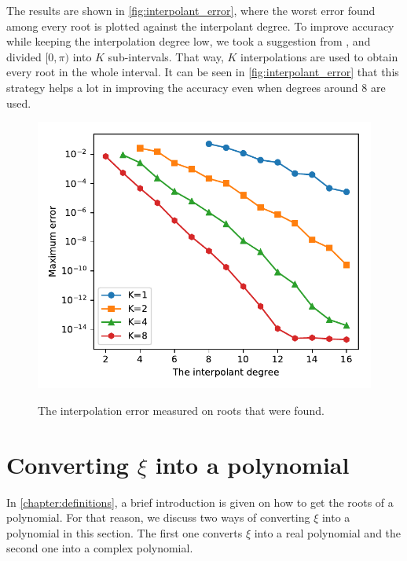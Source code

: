 The results are shown in \autoref{fig:interpolant_error}, where the worst error found among every root is plotted against the interpolant degree. To improve accuracy while keeping the interpolation degree low, we took a suggestion from , and divided  $[0, \pi)$ into $K$ sub-intervals. That way, $K$ interpolations are used to obtain every root in the whole interval. It can be seen in \autoref{fig:interpolant_error} that this strategy helps a lot in improving the accuracy even when degrees around $8$ are used.

\begin{figure}
	\centering
	\caption{The interpolation error measured on roots that were found.}
	\includegraphics{tex/figures/interpolant_error}
	\fautor
	\label{fig:interpolant_error}
\end{figure}

\section{Converting $\xi$ into a polynomial}

In \autoref{chapter:definitions}, a brief introduction is given on how to get the roots of a polynomial. For that reason, we discuss two ways of converting $\xi$ into a polynomial in this section. The first one converts $\xi$ into a real polynomial and the second one into a complex polynomial. 


